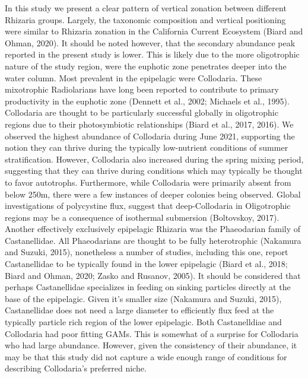 \documentclass[
]{article}
\begin{document}
In this study we present a clear pattern of vertical zonation between
different Rhizaria groups. Largely, the taxonomic composition and
vertical positioning were similar to Rhizaria zonation in the California
Current Ecosystem (Biard and Ohman, 2020). It should be noted however,
that the secondary abundance peak reported in the present study is
lower. This is likely due to the more oligotrophic nature of the study
region, were the euphotic zone penetrates deeper into the water column.
Most prevalent in the epipelagic were Collodaria. These mixotrophic
Radiolarians have long been reported to contribute to primary
productivity in the euphotic zone (Dennett et al., 2002; Michaels et
al., 1995). Collodaria are thought to be particularly successful
globally in oligotrophic regions due to their photosymbiotic
relationships (Biard et al., 2017, 2016). We observed the highest
abundance of Collodaria during June 2021, supporting the notion they can
thrive during the typically low-nutrient conditions of summer
stratification. However, Collodaria also increased during the spring
mixing period, suggesting that they can thrive during conditions which
may typically be thought to favor autotrophs. Furthermore, while
Collodaria were primarily absent from below 250m, there were a few
instances of deeper colonies being observed. Global investigations of
polycystine flux, suggest that deep-Collodaria in Oligotrophic regions
may be a consequence of isothermal submersion (Boltovskoy, 2017).
Another effectively exclusively epipelagic Rhizaria was the Phaeodarian
family of Castanellidae. All Phaeodarians are thought to be fully
heterotrophic (Nakamura and Suzuki, 2015), nonetheless a number of
studies, including this one, report Castanellidae to be typically found
in the lower epipelagic (Biard et al., 2018; Biard and Ohman, 2020;
Zasko and Rusanov, 2005). It should be considered that perhaps
Castanellidae specializes in feeding on sinking particles directly at
the base of the epipelagic. Given it's smaller size (Nakamura and
Suzuki, 2015), Castanellidae does not need a large diameter to
efficiently flux feed at the typically particle rich region of the lower
epipelagic. Both Castanelldiae and Collodaria had poor fitting GAMs.
This is somewhat of a surprise for Collodaria who had large abundance.
However, given the consistency of their abundance, it may be that this
study did not capture a wide enough range of conditions for describing
Collodaria's preferred niche.
\end{document}
